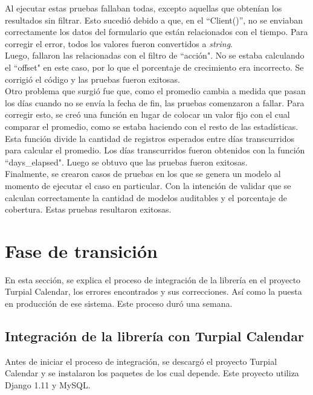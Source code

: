 Al ejecutar estas pruebas fallaban todas, excepto aquellas que obtenían los resultados sin filtrar. Esto sucedió debido a que, en el “Client()”, no se enviaban correctamente los datos del formulario que están relacionados con el tiempo. Para corregir el error, todos los valores fueron convertidos a \textit{string}. \\

Luego, fallaron las relacionadas con el filtro de “acción". No se estaba calculando el “offset" en este caso, por lo que el porcentaje de crecimiento era incorrecto. Se corrigió el código y las pruebas fueron exitosas.\\

Otro problema que surgió fue que, como el promedio cambia a medida que pasan los días cuando no se envía la fecha de fin, las pruebas comenzaron a fallar. Para corregir esto, se creó una función en lugar de colocar un valor fijo con el cual comparar el promedio, como se estaba haciendo con el resto de las estadísticas. Esta función divide la cantidad de registros esperados entre días transcurridos para calcular el promedio. Los días transcurridos fueron obtenidos con la función “days\_elapsed". Luego se obtuvo que las pruebas fueron exitosas.\\

Finalmente, se crearon casos de pruebas en los que se genera un modelo al momento de ejecutar el caso en particular. Con la intención de validar que se calculan correctamente la cantidad de modelos auditables y el porcentaje de cobertura. Estas pruebas resultaron exitosas.

\section{Fase de transición}

En esta sección, se explica el proceso de integración de la librería en el proyecto Turpial Calendar, los errores encontrados y sus correcciones. Así como la puesta en producción de ese sistema. Este proceso duró una semana.

\subsection{Integración de la librería con Turpial Calendar}

Antes de iniciar el proceso de integración, se descargó el proyecto Turpial Calendar y se instalaron los paquetes de los cual depende. Este proyecto utiliza Django 1.11 y MySQL. \\

